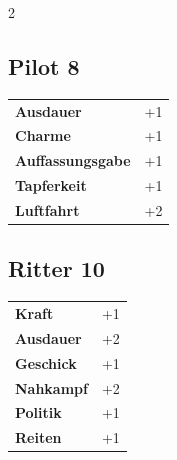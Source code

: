 \begin{multicols}{2}
\begin{tcolorbox}

\end{tcolorbox}

\begin{tcolorbox}
    \subsection*{Pilot \hfill \small{8 }}
    \tcblower




\begin{tabular}{@{}ll@{}}
    \textbf{Ausdauer} & +1\\
    \textbf{Charme} & +1\\
    \textbf{Auffassungsgabe} & +1\\
    \textbf{Tapferkeit} & +1\\
    \textbf{Luftfahrt} & +2\\
\end{tabular}


\end{tcolorbox}

\begin{tcolorbox}
    \subsection*{Ritter \hfill \small{10 }}
    \tcblower




\begin{tabular}{@{}ll@{}}
    \textbf{Kraft} & +1\\
    \textbf{Ausdauer} & +2\\
    \textbf{Geschick} & +1\\
    \textbf{Nahkampf} & +2\\
    \textbf{Politik} & +1\\
    \textbf{Reiten} & +1\\
\end{tabular}


\end{tcolorbox}
\end{multicols}
